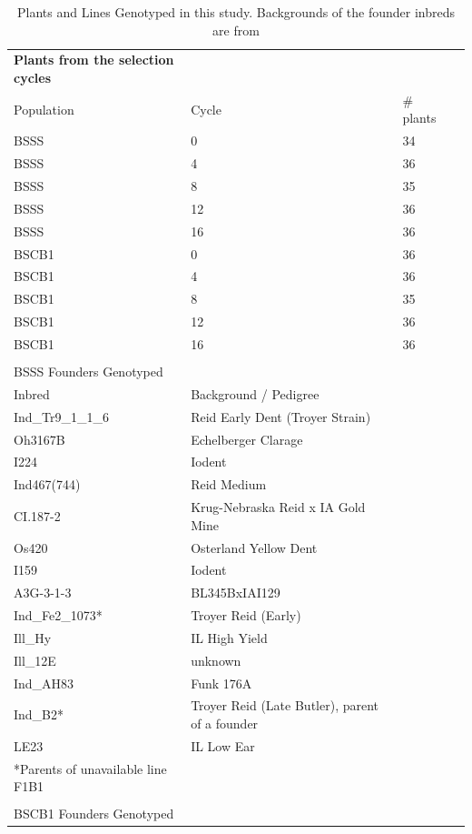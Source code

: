 \begin{table}
\caption{Plants and Lines Genotyped in this study.
Backgrounds of the founder inbreds are from \citet{hagdorn2003molecular}}
\begin{tabular}{ | l | l | l | l | }

	{\bf Plants from the selection cycles} &  &  &  \\ 
	Population  & Cycle & \# plants &   \\ 
	BSSS & 0 & 34 &  \\ 
	BSSS & 4 & 36 &  \\ 
	BSSS & 8 & 35 &  \\ 
	BSSS & 12 & 36 &  \\ 
	BSSS & 16 & 36 &  \\ 
	BSCB1 & 0 & 36 &  \\ 
	BSCB1 & 4 & 36 &  \\ 
	BSCB1 & 8 & 35 &  \\ 
	BSCB1 & 12 & 36 &  \\ 
	BSCB1 & 16 & 36 &  \\ 
	 &  &  &  \\ 
	BSSS Founders Genotyped &  &  &  \\ 
	Inbred & Background / Pedigree &  &  \\ 
	Ind\_Tr9\_1\_1\_6 & Reid Early Dent (Troyer Strain) &  &  \\ 
	Oh3167B & Echelberger Clarage &  &  \\ 
	I224 & Iodent &  &  \\ 
	Ind467(744) & Reid Medium &  &  \\ 
	CI.187-2 & Krug-Nebraska Reid x IA Gold Mine &  &  \\ 
	Os420 & Osterland Yellow Dent &  &  \\ 
	I159 & Iodent &  &  \\ 
	A3G-3-1-3 & BL345BxIAI129 &  &  \\ 
	Ind\_Fe2\_1073* & Troyer Reid (Early) &  &  \\ 
	Ill\_Hy & IL High Yield &  &  \\ 
	Ill\_12E & unknown &  &  \\ 
	Ind\_AH83 & Funk 176A &  &  \\ 
	Ind\_B2* & Troyer Reid (Late Butler), parent of a founder &  &  \\ 
	LE23 & IL Low Ear &  &  \\ 
	*Parents of unavailable line F1B1 &  &  &  \\ 
	 &  &  &  \\ 
	BSCB1 Founders Genotyped &  &  &  \\ 

\end{tabular}
\end{table}

